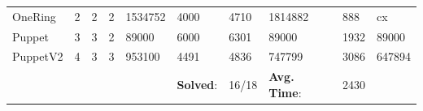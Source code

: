 \begin{table}[]
\begin{tabular}{|l|llll|llll|l|}
OneRing       & 2  & 2  & 2  & 1534752                       & 4000            & 4710           & 1814882      & 888        & cx       \\
Puppet        & 3  & 3  & 2  & 89000                         & 6000            & 6301           & 89000        & 1932       & 89000   \\
PuppetV2      & 4  & 3  & 3  & 953100                        & 4491            & 4836           & 747799       & 3086       & 647894  \\ \hline
\multicolumn{5}{|l|}{}     & \textbf{Solved}: & \multicolumn{1}{l}{16/18} & \textbf{Avg. Time}: & 2430  & \\ \hline       

\end{tabular}






\end{table}

